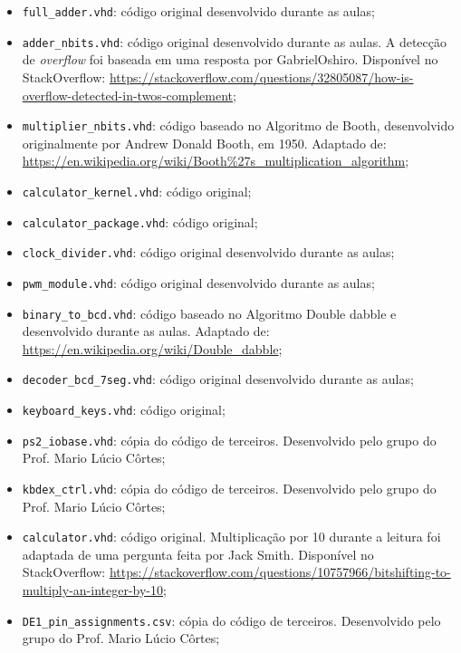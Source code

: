 \documentclass[a4paper, 12pt]{article}
\begin{document}
  \begin{itemize}
    \item
    \texttt{full\_adder.vhd}: código original desenvolvido durante as aulas;

    \item
    \texttt{adder\_nbits.vhd}: código original desenvolvido durante as aulas.
    A detecção de \emph{overflow} foi baseada em uma resposta
    por GabrielOshiro. Disponível no StackOverflow:
    \url{https://stackoverflow.com/questions/32805087/how-is-overflow-detected-in-twos-complement};

    \item
    \texttt{multiplier\_nbits.vhd}: código baseado
    no Algoritmo de Booth, desenvolvido originalmente por
    Andrew Donald Booth, em 1950. Adaptado de:
    \url{https://en.wikipedia.org/wiki/Booth\%27s_multiplication_algorithm};

    \item
    \texttt{calculator\_kernel.vhd}: código original;

    \item
    \texttt{calculator\_package.vhd}: código original;

    \item
    \texttt{clock\_divider.vhd}: código original desenvolvido durante as aulas;

    \item
    \texttt{pwm\_module.vhd}: código original desenvolvido durante as aulas;

    \item
    \texttt{binary\_to\_bcd.vhd}: código baseado no Algoritmo
    Double dabble e desenvolvido durante as aulas. Adaptado de:
    \url{https://en.wikipedia.org/wiki/Double_dabble};

    \item
    \texttt{decoder\_bcd\_7seg.vhd}: código original desenvolvido durante as aulas;

    \item
    \texttt{keyboard\_keys.vhd}: código original;

    \item
    \texttt{ps2\_iobase.vhd}: cópia do código de terceiros.
    Desenvolvido pelo grupo do Prof\@. Mario Lúcio Côrtes;

    \item
    \texttt{kbdex\_ctrl.vhd}: cópia do código de terceiros.
    Desenvolvido pelo grupo do Prof\@. Mario Lúcio Côrtes;

    \item
    \texttt{calculator.vhd}: código original. Multiplicação
    por 10 durante a leitura foi adaptada de uma pergunta
    feita por Jack Smith. Disponível no StackOverflow:
    \url{https://stackoverflow.com/questions/10757966/bitshifting-to-multiply-an-integer-by-10};

    \item
    \texttt{DE1\_pin\_assignments.csv}: cópia do código de terceiros.
    Desenvolvido pelo grupo do Prof\@. Mario Lúcio Côrtes;
  \end{itemize}
\end{document}
